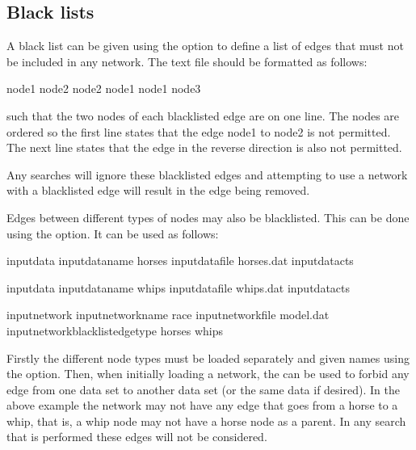\documentclass[letterpaper,10pt,english]{sphinxmanual}
\begin{document}
\subsection{Black lists}
\label{\detokenize{input-network:black-lists}}\label{\detokenize{input-network:input-network-black}}
\sphinxAtStartPar
A black list can be given using the  option to define a list of edges that must not be included in any network.
The text file should be formatted as follows:

\begin{sphinxVerbatim}[commandchars=\\\{\}]
node1 node2
node2 node1
node1 node3
\end{sphinxVerbatim}

\sphinxAtStartPar
such that the two nodes of each blacklisted edge are on one line. The nodes are ordered so the first line states that the edge node1 to node2 is not permitted.
The next line states that the edge in the reverse direction is also not permitted.

\sphinxAtStartPar
Any searches will ignore these blacklisted edges and attempting to use a network with a blacklisted edge will result in the edge being removed.

\sphinxAtStartPar
Edges between different types of nodes may also be blacklisted. This can be done using the  option. It can be used as follows:

\begin{sphinxVerbatim}[commandchars=\\\{\}]
\PYGZhy{}input\PYGZhy{}data
\PYGZhy{}input\PYGZhy{}data\PYGZhy{}name horses
\PYGZhy{}input\PYGZhy{}data\PYGZhy{}file horses.dat
\PYGZhy{}input\PYGZhy{}data\PYGZhy{}cts

\PYGZhy{}input\PYGZhy{}data
\PYGZhy{}input\PYGZhy{}data\PYGZhy{}name whips
\PYGZhy{}input\PYGZhy{}data\PYGZhy{}file whips.dat
\PYGZhy{}input\PYGZhy{}data\PYGZhy{}cts

\PYGZhy{}input\PYGZhy{}network
\PYGZhy{}input\PYGZhy{}network\PYGZhy{}name race
\PYGZhy{}input\PYGZhy{}network\PYGZhy{}file model.dat
\PYGZhy{}input\PYGZhy{}network\PYGZhy{}blacklist\PYGZhy{}edge\PYGZhy{}type horses whips
\end{sphinxVerbatim}

\sphinxAtStartPar
Firstly the different node types must be loaded separately and given names using the  option.
Then, when initially loading a network, the  can be used to forbid any edge from one data set to another data set (or the same data if desired).
In the above example the network may not have any edge that goes from a horse to a whip, that is, a whip node may not have a horse node as a parent.
In any search that is performed these edges will not be considered.
\end{document}
